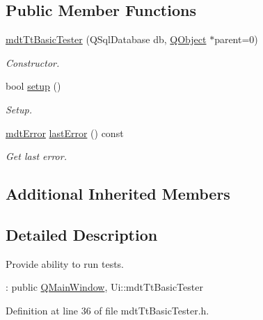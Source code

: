 \subsection*{Public Member Functions}
\begin{DoxyCompactItemize}
\item 
\hyperlink{classmdt_tt_basic_tester_a180ae78c3a887bb86acbb29ec42d3128}{mdt\-Tt\-Basic\-Tester} (Q\-Sql\-Database db, \hyperlink{class_q_object}{Q\-Object} $\ast$parent=0)
\begin{DoxyCompactList}\small\item\em Constructor. \end{DoxyCompactList}\item 
bool \hyperlink{classmdt_tt_basic_tester_ac831c6c6204439936c8f344f615bc50a}{setup} ()
\begin{DoxyCompactList}\small\item\em Setup. \end{DoxyCompactList}\item 
\hyperlink{classmdt_error}{mdt\-Error} \hyperlink{classmdt_tt_basic_tester_a56c25aca166611fe7a2f72e9c150c40c}{last\-Error} () const 
\begin{DoxyCompactList}\small\item\em Get last error. \end{DoxyCompactList}\end{DoxyCompactItemize}
\subsection*{Additional Inherited Members}


\subsection{Detailed Description}
Provide ability to run tests. 

\-: public \hyperlink{class_q_main_window}{Q\-Main\-Window}, Ui\-::mdt\-Tt\-Basic\-Tester 

Definition at line 36 of file mdt\-Tt\-Basic\-Tester.\-h.



